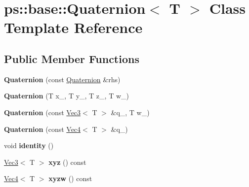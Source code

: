 \hypertarget{classps_1_1base_1_1Quaternion}{}\section{ps\+:\+:base\+:\+:Quaternion$<$ T $>$ Class Template Reference}
\label{classps_1_1base_1_1Quaternion}
\subsection*{Public Member Functions}
\begin{DoxyCompactItemize}
\item 
\hypertarget{classps_1_1base_1_1Quaternion_a9903fb590eb85a1af582b2ebe0d1044b}{}{\bfseries Quaternion} (const \hyperlink{classps_1_1base_1_1Quaternion}{Quaternion} \&rhs)\label{classps_1_1base_1_1Quaternion_a9903fb590eb85a1af582b2ebe0d1044b}

\item 
\hypertarget{classps_1_1base_1_1Quaternion_abd31fce62d2b8570ab08665e4714bdd1}{}{\bfseries Quaternion} (T x\+\_\+, T y\+\_\+, T z\+\_\+, T w\+\_\+)\label{classps_1_1base_1_1Quaternion_abd31fce62d2b8570ab08665e4714bdd1}

\item 
\hypertarget{classps_1_1base_1_1Quaternion_a1612947f376b2b11b392eba35d4d2d98}{}{\bfseries Quaternion} (const \hyperlink{classps_1_1base_1_1Vec3}{Vec3}$<$ T $>$ \&q\+\_\+, T w\+\_\+)\label{classps_1_1base_1_1Quaternion_a1612947f376b2b11b392eba35d4d2d98}

\item 
\hypertarget{classps_1_1base_1_1Quaternion_ae34a0d1eb033dba1a2ccbe6cb7544da1}{}{\bfseries Quaternion} (const \hyperlink{classps_1_1base_1_1Vec4}{Vec4}$<$ T $>$ \&q\+\_\+)\label{classps_1_1base_1_1Quaternion_ae34a0d1eb033dba1a2ccbe6cb7544da1}

\item 
\hypertarget{classps_1_1base_1_1Quaternion_a01d54399d22c490df2bc61991a343c4d}{}void {\bfseries identity} ()\label{classps_1_1base_1_1Quaternion_a01d54399d22c490df2bc61991a343c4d}

\item 
\hypertarget{classps_1_1base_1_1Quaternion_afe853b8d96380b74e612df03580608d6}{}\hyperlink{classps_1_1base_1_1Vec3}{Vec3}$<$ T $>$ {\bfseries xyz} () const \label{classps_1_1base_1_1Quaternion_afe853b8d96380b74e612df03580608d6}

\item 
\hypertarget{classps_1_1base_1_1Quaternion_a835b86f8154d6c4c5a34b4283be9430c}{}\hyperlink{classps_1_1base_1_1Vec4}{Vec4}$<$ T $>$ {\bfseries xyzw} () const \label{classps_1_1base_1_1Quaternion_a835b86f8154d6c4c5a34b4283be9430c}


\end{DoxyCompactItemize}
